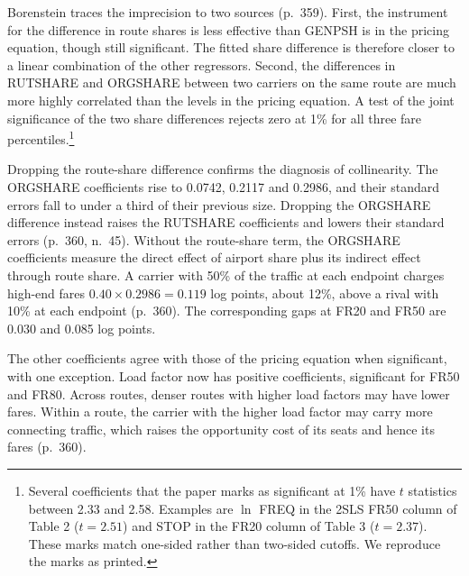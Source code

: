 Borenstein traces the imprecision to two sources (p.~359). First, the instrument for the difference in route
shares is less effective than GENPSH is in the pricing equation, though still significant. The fitted share
difference is therefore closer to a linear combination of the other regressors. Second, the differences in
RUTSHARE and ORGSHARE between two carriers on the same route are much more highly correlated than the levels in
the pricing equation. A test of the joint significance of the two share differences rejects zero at 1\% for all
three fare percentiles.\footnote{Several coefficients that the paper marks as significant at 1\% have $t$
statistics between 2.33 and 2.58. Examples are $\ln$ FREQ in the 2SLS FR50 column of Table 2 ($t = 2.51$) and STOP
in the FR20 column of Table 3 ($t = 2.37$). These marks match one-sided rather than two-sided cutoffs. We
reproduce the marks as printed.}

Dropping the route-share difference confirms the diagnosis of collinearity. The ORGSHARE coefficients rise to
0.0742, 0.2117 and 0.2986, and their standard errors fall to under a third of their previous size. Dropping the
ORGSHARE difference instead raises the RUTSHARE coefficients and lowers their standard errors (p.~360, n.~45).
Without the route-share term, the ORGSHARE coefficients measure the direct effect of airport share plus its
indirect effect through route share. A carrier with 50\%
of the traffic at each endpoint charges high-end fares $0.40 \times 0.2986 = 0.119$ log points, about 12\%,
above a rival with 10\% at each endpoint (p.~360). The corresponding gaps at FR20 and FR50 are 0.030 and 0.085
log points.

The other coefficients agree with those of the pricing equation when significant, with one exception. Load
factor now has positive coefficients, significant for FR50 and FR80. Across routes, denser routes with higher
load factors may have lower fares. Within a route, the carrier with the higher load factor may carry more
connecting traffic, which raises the opportunity cost of its seats and hence its fares (p.~360).

